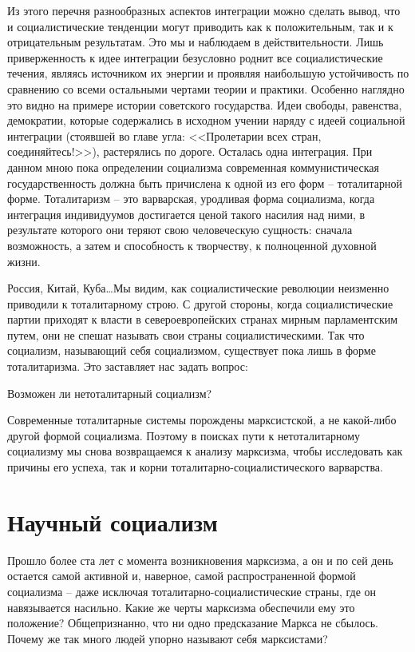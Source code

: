 \documentclass{book}
\begin{document}
Из этого перечня разнообразных аспектов интеграции можно сделать вывод, что и социалистические тенденции могут при­водить как к положительным, так и к отрицательным резуль­татам. Это мы и наблюдаем в действительности. Лишь привер­женность к идее интеграции безусловно роднит все социали­стические течения, являясь источником их энергии и проявляя наибольшую устойчивость по сравнению со всеми остальными чертами теории и практики. Особенно наглядно это видно на примере истории советского государства. Идеи свободы, ра­венства, демократии, которые содержались в исходном учении наряду с идеей социальной интеграции (стоявшей во главе угла: <<Пролетарии всех стран, соединяйтесь!>>), растерялись по доро­ге. Осталась одна интеграция. При данном мною пока опреде­лении социализма современная коммунистическая государст­венность должна быть причислена к одной из его форм -- тота­литарной форме. Тоталитаризм -- это варварская, уродливая форма социализма, когда интеграция индивидуумов достига­ется ценой такого насилия над 
ними, 
в результате которого они теряют свою человеческую сущность: сначала возможность, а затем и способность к творчеству, к полноценной духовной жизни.

Россия, Китай, Куба\ldots Мы видим, как социалистические ре­волюции неизменно приводили к тоталитарному строю. С дру­гой стороны, когда социалистические партии приходят к власти в североевропейских странах мирным парламентским путем, они не спешат называть свои страны социалистическими. Так что социализм, называющий себя социализмом, существует пока лишь в форме тоталитаризма. Это заставляет нас задать вопрос:

Возможен ли нетоталитарный социализм?

Современные тоталитарные системы порождены марксистской, а не какой-либо другой формой социализма. Поэтому в поисках пути к нетоталитарному социализму мы снова возвращаемся к анализу марксизма, чтобы исследовать как причины его успеха, так и корни тоталитарно-социалистического варварства.


\section{Научный социализм}

Прошло более ста лет с момента возникновения марксизма, а он и по сей день остается самой активной и, наверное, самой распространенной формой социализма -- даже исключая тота­литарно-социалистические страны, где он навязывается насиль­но. Какие же черты марксизма обеспечили ему это положение? Общепризнанно, что ни одно предсказание Маркса не сбылось. Почему же так много людей упорно называют себя маркси­стами?
\end{document}
